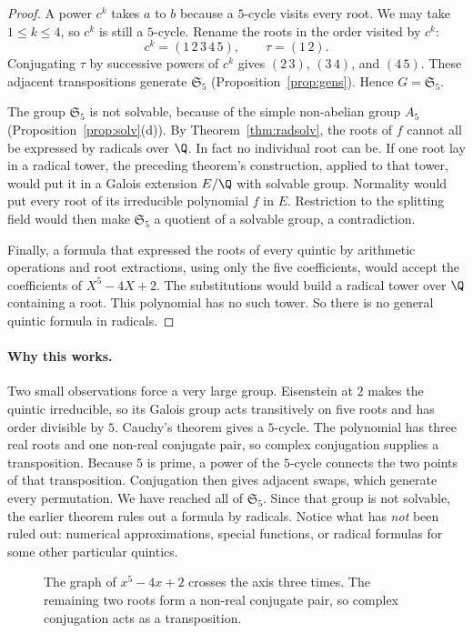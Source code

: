 \begin{proof}
A power $c^k$ takes $a$ to $b$ because a $5$-cycle visits every root. We may take $1\le k\le4$, so $c^k$ is still a $5$-cycle. Rename the roots in the order visited by $c^k$:
\[
c^k=(1\,2\,3\,4\,5),\qquad\tau=(1\,2).
\]
Conjugating $\tau$ by successive powers of $c^k$ gives $(2\,3)$, $(3\,4)$, and $(4\,5)$. These adjacent transpositions generate $\mathfrak S_5$ (Proposition~\ref{prop:gens}). Hence $G=\mathfrak S_5$.

The group $\mathfrak S_5$ is not solvable, because of the simple non-abelian group $A_5$ (Proposition~\ref{prop:solv}(d)). By Theorem~\ref{thm:radsolv}, the roots of $f$ cannot all be expressed by radicals over $\Q$.
In fact no individual root can be. If one root lay in a radical tower,
the preceding theorem's construction, applied to that tower, would put it
in a Galois extension $E/\Q$ with solvable group. Normality would put every
root of its irreducible polynomial $f$ in $E$. Restriction to the splitting
field would then make $\mathfrak S_5$ a quotient of a solvable group,
a contradiction.

Finally, a formula that expressed the roots of every quintic by arithmetic operations and root extractions, using only the five coefficients, would accept the coefficients of $X^5-4X+2$. The substitutions would build a radical tower over $\Q$ containing a root. This polynomial has no such tower. So there is no general quintic formula in radicals.
\end{proof}

\paragraph{Why this works.}
Two small observations force a very large group. Eisenstein at $2$ makes the quintic irreducible, so its Galois group acts transitively on five roots and has order divisible by $5$. Cauchy's theorem gives a $5$-cycle. The polynomial has three real roots and one non-real conjugate pair, so complex conjugation supplies a transposition. Because $5$ is prime, a power of the $5$-cycle connects the two points of that transposition. Conjugation then gives adjacent swaps, which generate every permutation. We have reached all of $\mathfrak S_5$. Since that group is not solvable, the earlier theorem rules out a formula by radicals. Notice what has \emph{not} been ruled out: numerical approximations, special functions, or radical formulas for some other particular quintics.

\begin{figure}[ht]
\centering
{}
\caption{The graph of $x^5-4x+2$ crosses the axis three times. The remaining two roots form a non-real conjugate pair, so complex conjugation acts as a transposition.}
\label{fig:quintic-real-roots}
\end{figure}


